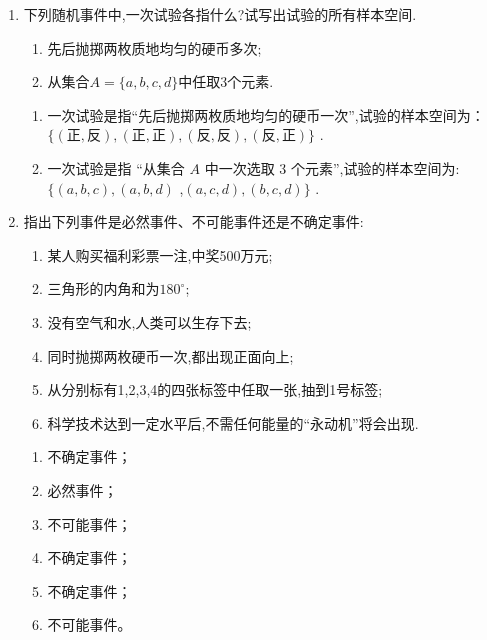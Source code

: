 \begin{enumerate}
\item 下列随机事件中,一次试验各指什么?试写出试验的所有样本空间.
\begin{enumerate}
\item 先后抛掷两枚质地均匀的硬币多次;
\item 从集合$A=\{a, b, c,d\}$中任取3个元素.
\end{enumerate}

\begin{jieda}
    \begin{enumerate}
        \item 一次试验是指“先后抛掷两枚质地均匀的硬币一次”,试验的样本空间为：
        $\{ \left( {\text{正},\text{反}}\right) ,\left( {\text{正},\text{正}}\right) ,\left( {\text{反},\text{反}}\right) ,\left( {\text{反},\text{正}}\right) \}$ .
        
        \item 一次试验是指 “从集合 $A$ 中一次选取 3 个元素”,试验的样本空间为: $\{ \left( {a,b,c}\right) ,\left( {a,b,d}\right)$ ,$\left( {a,c,d}\right) ,\left( {b,c,d}\right) \}$ .
    \end{enumerate}
\end{jieda}

\item 指出下列事件是必然事件、不可能事件还是不确定事件:
\begin{enumerate}
\item 某人购买福利彩票一注,中奖500万元;
\item 三角形的内角和为$180^{\circ}$;
\item 没有空气和水,人类可以生存下去;
\item 同时抛掷两枚硬币一次,都出现正面向上;
\item 从分别标有1,2,3,4的四张标签中任取一张,抽到1号标签;
\item 科学技术达到一定水平后,不需任何能量的“永动机”将会出现.
\end{enumerate}

\begin{jieda}
    \begin{enumerate}
        \item 不确定事件；
        \item 必然事件；
        \item 不可能事件；
        \item 不确定事件；
        \item 不确定事件；
        \item 不可能事件。
    \end{enumerate}
\end{jieda}


\end{enumerate}
